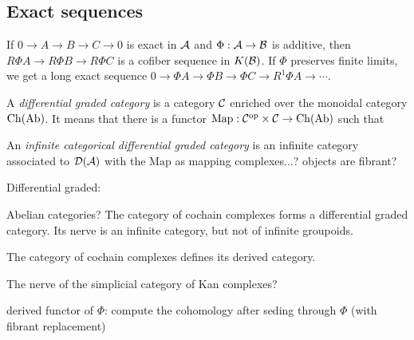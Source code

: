 \documentclass{../../../small}
\begin{document}
\subsection{Exact sequences}


\begin{prop*}
If $0\to A\to B\to C\to0$ is exact in $\mathcal{A}$ and $\Phi:\mathcal{A}\to\mathcal{B}$ is additive, then $R\Phi A\to R\Phi B\to R\Phi C$ is a cofiber sequence in $K(\mathcal{B})$.
If $\Phi$ preserves finite limits, we get a long exact sequence $0\to\Phi A\to\Phi B\to\Phi C\to R^1\Phi A\to\cdots$.
\end{prop*}



A \emph{differential graded category} is a category $\mathcal{C}$ enriched over the monoidal category $\mathrm{Ch}(\mathrm{Ab})$.
It means that there is a functor $\mathrm{Map}:\mathcal{C}^{\mathrm{op}}\times\mathcal{C}\to\mathrm{Ch}(\mathrm{Ab})$ such that

An \emph{infinite categorical differential graded category} is an infinite category associated to $\mathcal{D}(\mathcal{A})$ with the $\mathrm{Map}$ as mapping complexes...? objects are fibrant?




\bigskip

Differential graded:

Abelian categories?
The category of cochain complexes forms a differential graded category.
Its nerve is an infinite category, but not of infinite groupoids.

The category of cochain complexes defines its derived category.

The nerve of the simplicial category of Kan complexes?

derived functor of $\Phi$: compute the cohomology after seding through $\Phi$ (with fibrant replacement)
\end{document}
